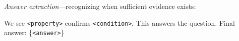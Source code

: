 \documentclass[sigconf]{acmart}
\begin{document}


\textit{Answer extraction}---recognizing when sufficient evidence exists:
\begin{promptbox}
We see \texttt{<property>} confirms \texttt{<condition>}. This answers the question.
Final answer: \{\texttt{<answer>}\}
\end{promptbox}


\end{document}
